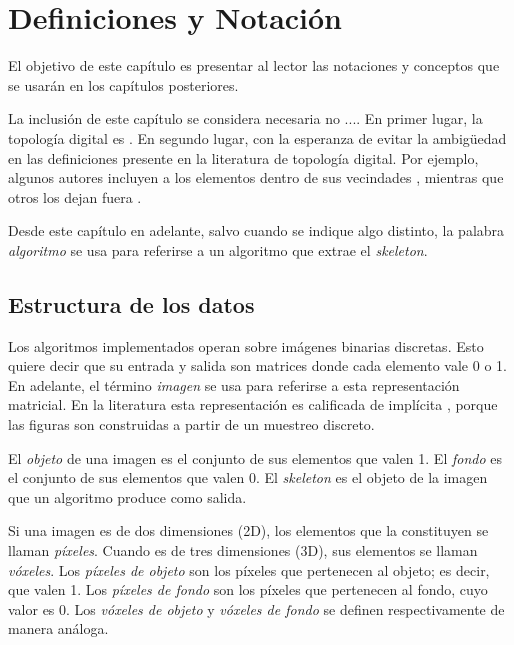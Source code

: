 \chapter{Definiciones y Notación}
\label{ch:defs}

El objetivo de este capítulo es presentar al lector las notaciones y conceptos que se usarán en los capítulos posteriores.

La inclusión de este capítulo se considera necesaria no .... En primer lugar, la topología digital es . En segundo lugar, con la esperanza de evitar la ambigüedad en las definiciones presente en la literatura de topología digital. Por ejemplo, algunos autores incluyen a los elementos dentro de sus vecindades \cite{cornea2007curve}, mientras que otros los dejan fuera \cite{lam1992thinning}.

Desde este capítulo en adelante, salvo cuando se indique algo distinto, la palabra \textit{algoritmo} se usa para referirse a un algoritmo que extrae el \textit{skeleton}.

\section{Estructura de los datos}

Los algoritmos implementados operan sobre imágenes binarias discretas. Esto quiere decir que su entrada y salida son matrices donde cada elemento vale 0 o 1. En adelante, el término \textit{imagen} se usa para referirse a esta representación matricial. En la literatura esta representación es calificada de implícita \cite{bloomenthal1997introduction}, porque las figuras son construidas a partir de un muestreo discreto.

El \textit{objeto} de una imagen es el conjunto de sus elementos que valen 1. El \textit{fondo} es el conjunto de sus elementos que valen 0. El \textit{skeleton} es el objeto de la imagen que un algoritmo produce como salida.

Si una imagen es de dos dimensiones (2D), los elementos que la constituyen se llaman \textit{píxeles}. Cuando es de tres dimensiones (3D), sus elementos se llaman \textit{vóxeles}. Los \textit{píxeles de objeto} son los píxeles que pertenecen al objeto; es decir, que valen 1. Los \textit{píxeles de fondo} son los píxeles que pertenecen al fondo, cuyo valor es 0. Los \textit{vóxeles de objeto} y \textit{vóxeles de fondo} se definen respectivamente de manera análoga. 


